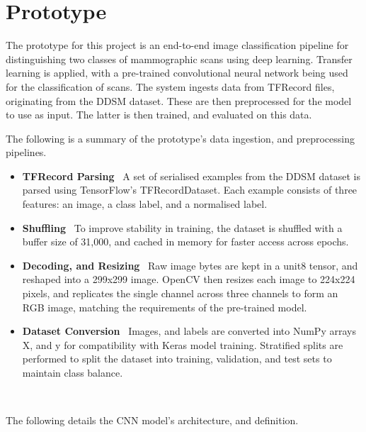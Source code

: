 \documentclass[../main]{subfiles}
\begin{document}
\chapter{Prototype}
The prototype for this project is an end-to-end image classification pipeline for distinguishing two classes of mammographic scans using deep learning. Transfer learning is applied, with a pre-trained convolutional neural network being used for the classification of scans. The system ingests data from TFRecord files, originating from the DDSM dataset. These are then preprocessed for the model to use as input. The latter is then trained, and evaluated on this data.

\noindent The following is a summary of the prototype's data ingestion, and preprocessing pipelines.

\begin{itemize}
	\item \textbf{TFRecord Parsing} \textemdash\ A set of serialised examples from the DDSM dataset is parsed using TensorFlow's TFRecordDataset. Each example consists of three features: an image, a class label, and a normalised label.
	\item \textbf{Shuffling} \textemdash\ To improve stability in training, the dataset is shuffled with a buffer size of 31,000, and cached in memory for faster access across epochs.
	\item \textbf{Decoding, and Resizing} \textemdash\ Raw image bytes are kept in a unit8 tensor, and reshaped into a 299x299 image. OpenCV then resizes each image to 224x224 pixels, and replicates the single channel across three channels to form an RGB image, matching the requirements of the pre-trained model.
	\item \textbf{Dataset Conversion} \textemdash\ Images, and labels are converted into NumPy arrays X, and y for compatibility with Keras model training. Stratified splits are performed to split the dataset into training, validation, and test sets to maintain class balance. 
\end{itemize} 

\

\noindent The following details the CNN model's architecture, and definition.
\end{document}
